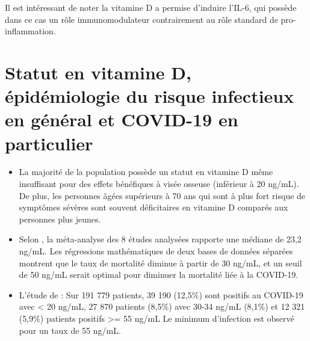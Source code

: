 \documentclass[
  a4paper,
  DIV=11,
  numbers=noendperiod,
  listof=totoc]{scrreprt}
\begin{document}
Il est intéressant de noter la vitamine D a permise d'induire l'IL-6,
qui possède dans ce cas un rôle immunomodulateur contrairement au rôle
standard de pro-inflammation. \autocite{Chauss.2022}

\textcite{Bishop.2021}

\section{Statut en vitamine D, épidémiologie du risque infectieux en
général et COVID-19 en particulier}\label{sec-statut-vd}

\begin{itemize}
\item
  La majorité de la population possède un statut en vitamine D même
  insuffisant pour des effets bénéfiques à visée osseuse (inférieur à 20
  ng/mL). De plus, les personnes âgées supérieurs à 70 ans qui sont à
  plus fort risque de symptômes sévères sont souvent déficitaires en
  vitamine D comparés aux personnes plus jeunes.
\item
  Selon \textcite{Borsche.2021}, la méta-analyse des 8 études analysées
  rapporte une médiane de 23,2 ng/mL. Les régressions mathématiques de
  deux bases de données séparées montrent que le taux de mortalité
  diminue à partir de 30 ng/mL, et un seuil de 50 ng/mL serait optimal
  pour diminuer la mortalité liée à la COVID-19.
\item
  L'étude de \textcite{Kaufman.2020} : Sur 191 779 patients, 39 190
  (12,5\%) sont positifs au COVID-19 avec \textless{} 20 ng/mL, 27 870
  patients (8,5\%) avec 30-34 ng/mL (8,1\%) et 12 321 (5,9\%) patients
  positifs \textgreater= 55 ng/mL Le minimum d'infection est observé
  pour un taux de 55 ng/mL.
\end{itemize}
\end{document}
